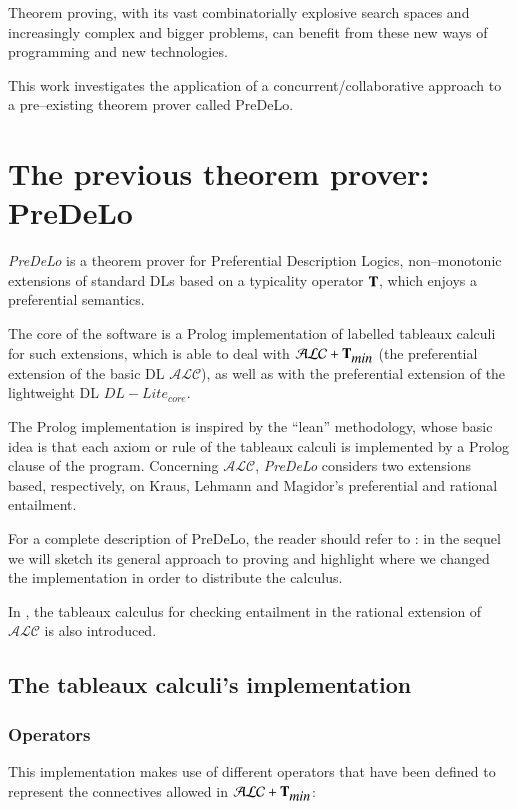 \documentclass[a4paper, 11pt, oneside]{elsarticle}
\newcommand{\tip}{{\bf T}}
\newcommand{\alc}{\mathcal{ALC}}
\newcommand{\alctmin}{\mathcal{ALC}+\tip_{\mbox{\em min}}}
\begin{document}
Theorem proving, with its vast combinatorially explosive search spaces and increasingly complex and bigger problems, can benefit from these new ways of programming and new technologies\cite{conf/ieeehpcs/SripriyaBS09}.


This work investigates the application of a concurrent/collaborative approach to a pre--existing theorem prover called PreDeLo.

\section{The previous theorem prover: PreDeLo}\label{predelo}
\emph{PreDeLo} is a theorem prover for Preferential Description Logics, non--monotonic extensions of standard DLs based on a typicality operator $\tip$, which enjoys a preferential semantics.

The core of the software is a Prolog implementation of labelled tableaux calculi for such extensions, which is able to deal with $\alctmin$ (the preferential extension of the basic DL $\alc$), as well as with the preferential extension of the lightweight DL $DL-Lite_{core}$.

The Prolog implementation is inspired by the ``lean'' methodology, whose basic idea is that each axiom or rule of the tableaux calculi is implemented by a Prolog clause of the program.
Concerning $\alc$, \emph{PreDeLo} considers two extensions based, respectively, on Kraus, Lehmann and Magidor’s preferential and rational entailment.

For a complete description of PreDeLo, the reader should refer to \cite{conf/aiia/GiordanoGJOP13}: in the sequel we will sketch its general approach to proving and highlight where we changed the implementation in order to distribute the calculus.

In \cite{conf/aiia/GiordanoGJOP13}, the tableaux calculus for checking entailment in the rational extension of $\alc$ is also introduced.

\subsection{The tableaux calculi's implementation}

\subsubsection{Operators}

This implementation makes use of different operators that have been defined to represent the connectives allowed in $\alctmin$:
\end{document}
